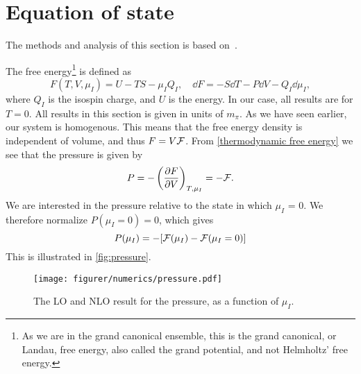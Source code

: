 \section{Equation of state}
The methods and analysis of this section is based on~\cite{Peskin:IntroQFT,Andersen:two-flavor-chpt,andersen2012introduction}.

The free energy\footnote{As we are in the grand canonical ensemble, this is the grand canonical, or Landau, free energy, also called the grand potential, and not Helmholtz' free energy.}
is defined as
\begin{equation}
    \label{thermodynamic free energy}
    F(T, V, \mu_I) = U - TS - \mu_I Q_I, 
    \quad \dd 
    F = - S \dd T - P \dd V - Q_I \dd \mu_I ,
\end{equation}
where $Q_I$ is the isospin charge, and $U$ is the energy.
In our case, all results are for $T = 0$.
All results in this section is given in units of $m_\pi$.
As we have seen earlier, our system is homogenous.
This means that the free energy density is independent of volume, and thus $F = V \mathcal{F}$.
From  \cref{thermodynamic free energy} we see that the pressure is given by
\begin{equation}
    P = - \left(\diffp{F}{V}\right)_{T, \mu_I} = - \Ef.
\end{equation}
We are interested in the pressure relative to the state in which $\mu_I$ = 0. We therefore normalize $P(\mu_I=0) = 0$, which gives  
\begin{equation}
    P(\mu_I) = -[\mathcal{F}(\mu_I) - \mathcal{F}(\mu_I = 0)]
\end{equation}
This is illustrated in \autoref{fig:pressure}.
\begin{figure}[h]
    \centering
    \vspace{-0.2cm}
    \texttt{[image: figurer/numerics/pressure.pdf]}
    \caption{The LO and NLO result for the pressure, as a function of $\mu_I$.}
    \label{fig:pressure}
\end{figure}

